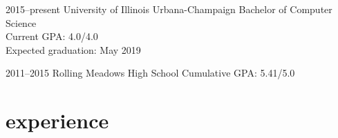 \documentclass[nofooter,print]{resume}
\begin{document}
\begin{entrylist}


\entry
{2015--present}
{University of Illinois Urbana-Champaign}
{}
{Bachelor of Computer Science \\
Current GPA: 4.0/4.0 \\
Expected graduation: May 2019}


\entry
{2011--2015}
{Rolling Meadows High School}
{}
{Cumulative GPA: 5.41/5.0}


\end{entrylist}


\section{experience}

\end{document}
